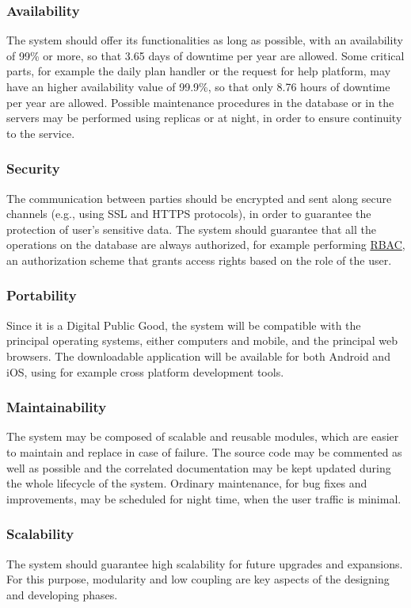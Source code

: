 \subsubsection{Availability}
The system should offer its functionalities as long as possible, with an availability of 99\% or more, so that 3.65 days of downtime per year are allowed. Some critical parts, for example the daily plan handler or the request for help platform, may have an higher availability value of 99.9\%, so that only 8.76 hours of downtime per year are allowed. 
\newline
Possible maintenance procedures in the database or in the servers may be performed using replicas or at night, in order to ensure continuity to the service.
\subsubsection{Security}
The communication between parties should be encrypted and sent along secure channels (e.g., using SSL and HTTPS protocols), in order to guarantee the protection of user’s sensitive data. 
\newline
The system should guarantee that all the operations on the database are always authorized, for example performing \hyperref[tab:acronymsTable]{RBAC}, an authorization scheme that grants access rights based on the role of the user.
\subsubsection{Portability}
Since it is a Digital Public Good, the system will be compatible with the principal operating systems, either computers and mobile, and the principal web browsers. The downloadable application will be available for both Android and iOS, using for example cross platform development tools.
\subsubsection{Maintainability}
The system may be composed of scalable and reusable modules, which are easier to maintain and replace in case of failure. The source code may be commented as well as possible and the correlated documentation may be kept updated during the whole lifecycle of the system. Ordinary maintenance, for bug fixes and improvements, may be scheduled for night time, when the user traffic is minimal.
\subsubsection{Scalability}
The system should guarantee high scalability for future upgrades and expansions. For this purpose, modularity and low coupling are key aspects of the designing and developing phases.